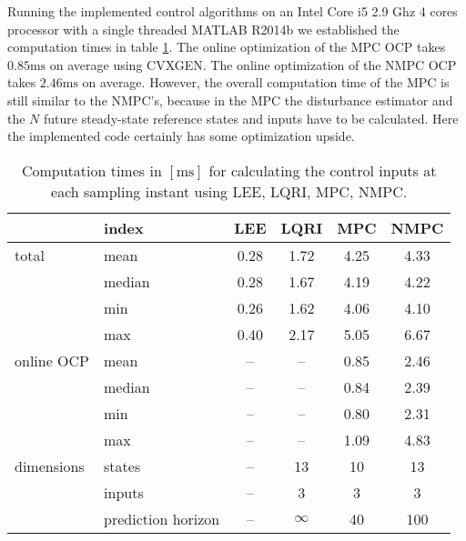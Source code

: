 Running the implemented control algorithms on an Intel Core i5 2.9 Ghz 4 cores processor with a single threaded MATLAB R2014b we established the computation times in table \ref{tab:computation_times}. The online optimization of the MPC OCP takes $0.85 \si{\milli\second}$ on average using CVXGEN. The online optimization of the NMPC OCP takes $2.46 \si{\milli\second}$ on average. However, the overall computation time of the MPC is still similar to the NMPC's, because in the MPC the disturbance estimator and the $N$ future steady-state reference states and inputs have to be calculated. Here the implemented code certainly has some optimization upside.
\begin{table}
\begin{center}
\caption{Computation times in $[\si{\milli\second}]$ for calculating the control inputs at each sampling instant using LEE, LQRI, MPC, NMPC.}\vspace{1ex}
\label{tab:computation_times}
\begin{tabular}{ll|cccc}
\hline
      & index  & LEE        & LQRI       & MPC        & NMPC       \\ \hline \hline
total & mean   & \num{0.28} & \num{1.72} & \num{4.25} & \num{4.33} \\
      & median & \num{0.28} & \num{1.67} & \num{4.19} & \num{4.22} \\
      & min    & \num{0.26} & \num{1.62} & \num{4.06} & \num{4.10} \\
      & max    & \num{0.40} & \num{2.17} & \num{5.05} & \num{6.67} \\
\hline
online OCP & mean   & -- & -- & \num{0.85} & \num{2.46}\\
           & median & -- & -- & \num{0.84} & \num{2.39}\\
           & min    & -- & -- & \num{0.80} & \num{2.31}\\
           & max    & -- & -- & \num{1.09} & \num{4.83}\\
\hline
dimensions & states & -- & 13 & 10 & 13 \\
 		   & inputs & -- & 3  & 3  & 3  \\
 		   & prediction horizon & -- & $\infty$ & \num{40} & \num{100} \\
\hline
\end{tabular}
\end{center}
\end{table}
